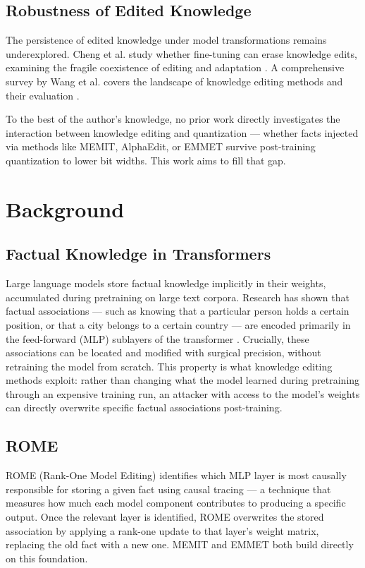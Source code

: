 \documentclass[conference]{IEEEtran}
\begin{document}
\subsection{Robustness of Edited Knowledge}

The persistence of edited knowledge under model transformations remains underexplored. Cheng et al. study whether fine-tuning can erase knowledge edits, examining the fragile coexistence of editing and adaptation \cite{b8}. A comprehensive survey by Wang et al. covers the landscape of knowledge editing methods and their evaluation \cite{b9}.

To the best of the author's knowledge, no prior work directly investigates the interaction between knowledge editing and quantization --- whether facts injected via methods like MEMIT, AlphaEdit, or EMMET survive post-training quantization to lower bit widths. This work aims to fill that gap.

\section{Background}
\label{sec:background}

\subsection{Factual Knowledge in Transformers}

Large language models store factual knowledge implicitly in their weights, accumulated during pretraining on large text corpora. Research has shown that factual associations --- such as knowing that a particular person holds a certain position, or that a city belongs to a certain country --- are encoded primarily in the feed-forward (MLP) sublayers of the transformer \cite{b11}. Crucially, these associations can be located and modified with surgical precision, without retraining the model from scratch. This property is what knowledge editing methods exploit: rather than changing what the model learned during pretraining through an expensive training run, an attacker with access to the model's weights can directly overwrite specific factual associations post-training.

\subsection{ROME}

ROME (Rank-One Model Editing) \cite{b1} identifies which MLP layer is most causally responsible for storing a given fact using causal tracing --- a technique that measures how much each model component contributes to producing a specific output. Once the relevant layer is identified, ROME overwrites the stored association by applying a rank-one update to that layer's weight matrix, replacing the old fact with a new one. MEMIT and EMMET both build directly on this foundation.
\end{document}
